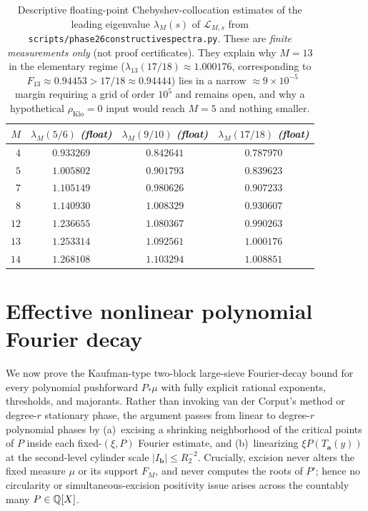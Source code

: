 \documentclass[11pt]{article}
\newcommand{\ttt}[1]{\texttt{\begingroup\def\_{\textunderscore\discretionary{}{}{}}#1\endgroup}}
\newcommand{\Lop}{\mathcal{L}}
\newcommand{\rhoK}{\rho_{\mathrm{Klo}}}
\DeclareMathOperator{\dimH}{\dim_{\mathrm{H}}}
\begin{document}
\begin{table}[ht]
\centering\small
\begin{tabular}{@{}rccc@{}}
\toprule
$M$ & $\lambda_M(5/6)$ \emph{(float)} & $\lambda_M(9/10)$ \emph{(float)} & $\lambda_M(17/18)$ \emph{(float)} \\
\midrule
$4$ & $0.933269$ & $0.842641$ & $0.787970$ \\
$5$ & $1.005802$ & $0.901793$ & $0.839623$ \\
$7$ & $1.105149$ & $0.980626$ & $0.907233$ \\
$8$ & $1.140930$ & $1.008329$ & $0.930607$ \\
$12$ & $1.236655$ & $1.080367$ & $0.990263$ \\
$13$ & $1.253314$ & $1.092561$ & $1.000176$ \\
$14$ & $1.268108$ & $1.103294$ & $1.008851$ \\
\bottomrule
\end{tabular}
\caption{Descriptive floating-point Chebyshev-collocation estimates of the leading eigenvalue $\lambda_M(s)$ of $\Lop_{M,s}$ from \ttt{scripts/phase26\_constructive\_spectra.py}. These are \emph{finite measurements only} (not proof certificates). They explain why $M=13$ in the elementary regime ($\lambda_{13}(17/18)\approx1.000176$, corresponding to $\dimH F_{13}\approx0.94453>17/18\approx0.94444$) lies in a narrow $\approx9\times10^{-5}$ margin requiring a grid of order $10^5$ and remains open, and why a hypothetical $\rhoK=0$ input would reach $M=5$ and nothing smaller.}\label{tab:eigs}
\end{table}

\section{Effective nonlinear polynomial Fourier decay}\label{sec:fourier}

We now prove the Kaufman-type two-block large-sieve Fourier-decay bound for every polynomial pushforward $P_*\mu$ with fully explicit rational exponents, thresholds, and majorants. Rather than invoking van der Corput's method or degree-$r$ stationary phase, the argument passes from linear to degree-$r$ polynomial phases by (a)~excising a shrinking neighborhood of the critical points of $P$ inside each fixed-$(\xi,P)$ Fourier estimate, and (b)~linearizing $\xi P(T_{\mathbf{a}}(y))$ at the second-level cylinder scale $|I_{\mathbf{b}}|\le R_2^{-2}$. Crucially, excision never alters the fixed measure $\mu$ or its support $F_M$, and never computes the roots of $P'$; hence no circularity or simultaneous-excision positivity issue arises across the countably many $P\in\mathbb Q[X]$.
\end{document}
